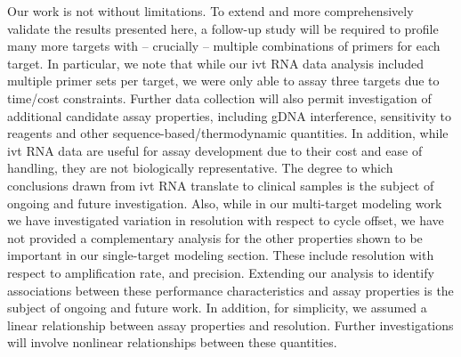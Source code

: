 \documentclass[../thesis.tex]{subfiles}
\begin{document}
Our work is not without limitations. To extend and more comprehensively validate the results presented here, a follow-up study will be required to profile many more targets with -- crucially -- multiple combinations of primers for each target. In particular, we note that while our \gls{ivt} RNA data analysis included multiple primer sets per target, we were only able to assay three targets due to time/cost constraints. Further data collection will also permit investigation of additional candidate assay properties, including gDNA interference, sensitivity to reagents and other sequence-based/thermodynamic quantities. In addition, while \gls{ivt} RNA data are useful for assay development due to their cost and ease of handling, they are not biologically representative. The degree to which conclusions drawn from \gls{ivt} RNA translate to  clinical samples is the subject of ongoing and future investigation. Also, while in our multi-target modeling work we have investigated variation in resolution with respect to cycle offset, we have not provided a complementary analysis for the other properties shown to be important in our single-target modeling section. These include resolution with respect to amplification rate, and precision. Extending our analysis to identify associations between these performance characteristics and assay properties is the subject of ongoing and future work. In addition, for simplicity, we assumed a linear relationship between assay properties and resolution. Further investigations will involve nonlinear relationships between these quantities.


\end{document}

